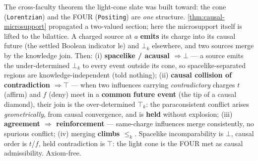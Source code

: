 \begin{theorem}\label{thm:charged-microsupport}\leanok{}
The cross-faculty theorem the light-cone slate was built toward: the cone (\texttt{Lorentzian}) and
the FOUR (\texttt{Positing}) are \emph{one} structure. \cref{thm:causal-microsupport} propagated a
two-valued section; here the microsupport itself is lifted to the bilattice. A charged source at $a$
\textbf{emits} its charge into its causal future (the settled Boolean indicator $\mathrm{le}$) and
$\bot_k$ elsewhere, and two sources merge by the knowledge join. Then: (i) \textbf{spacelike /
acausal $\Rightarrow \bot$} --- a source emits the under-determined $\bot_k$ to every event outside
its cone, so spacelike-separated regions are knowledge-independent (told nothing); (ii)
\textbf{causal collision of contradiction $\Rightarrow \top$} --- when two influences carrying
\emph{contradictory} charges $t$ (affirm) and $f$ (deny) meet in a \textbf{common future event} (the
tip of a causal diamond), their join is the over-determined $\top_k$: the paraconsistent conflict
arises \emph{geometrically}, from causal convergence, and is \textbf{held} without explosion; (iii)
\textbf{agreement $\Rightarrow$ reinforcement} --- same-charge influences merge consistently, no
spurious conflict; (iv) merging \textbf{climbs $\leq_k$}. Spacelike incomparability is $\bot$, causal
order is $t$/$f$, held contradiction is $\top$: the light cone is the FOUR met as
causal admissibility. Axiom-free.
\end{theorem}

